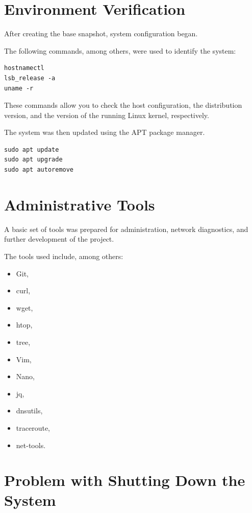 \section{Environment Verification}

After creating the base snapshot, system configuration began.

The following commands, among others, were used to identify the system:

\begin{lstlisting}[style=terminal]
hostnamectl
lsb_release -a
uname -r
\end{lstlisting}

These commands allow you to check the host configuration, the
distribution version, and the version of the running Linux kernel, respectively.

The system was then updated using the APT package manager.

\begin{lstlisting}[style=terminal]
sudo apt update
sudo apt upgrade
sudo apt autoremove
\end{lstlisting}

\section{Administrative Tools}

A basic set of tools was prepared for administration,
network diagnostics, and further development of the project.

The tools used include, among others:

\begin{itemize}
    \item Git,
    \item curl,
    \item wget,
    \item htop,
    \item tree,
    \item Vim,
    \item Nano,
    \item jq,
    \item dnsutils,
    \item traceroute,
    \item net-tools.
\end{itemize}

\section{Problem with Shutting Down the System}

